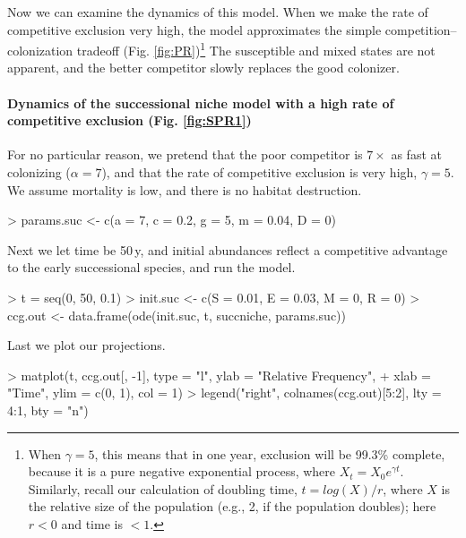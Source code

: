 Now we can examine the dynamics of this model. When we make the rate of competitive exclusion very high, the model approximates the simple competition--colonization tradeoff  (Fig. \ref{fig:PR})\footnote{When $\gamma=5$, this means that in one year, exclusion will be 99.3\% complete, because it is a pure negative exponential process, where $X_t=X_0e^{\gamma t}$. Similarly, recall our calculation of doubling time, $t=log(X)/r$, where $X$ is the relative size of the population (e.g., 2, if the population doubles); here $r<0$ and time is $< 1$.} The susceptible and mixed states are not apparent, and the better competitor slowly replaces the good colonizer.

\medskip \noindent
\begin{boxedminipage}{\linewidth}
  {\footnotesize
\paragraph{Dynamics of the successional niche model with a high rate of competitive exclusion (Fig. \ref{fig:SPR1})} 
For no particular reason, we pretend that the poor competitor is $7 \times$ as fast at colonizing ($\alpha=7$), and that the rate of competitive exclusion is very high, $\gamma=5$. We assume mortality is low, and there is no habitat destruction.
\begin{Schunk}
\begin{Sinput}
> params.suc <- c(a = 7, c = 0.2, g = 5, m = 0.04, D = 0)
\end{Sinput}
\end{Schunk}
Next we let time be 50\,y, and initial abundances reflect a competitive advantage to the early successional species, and run the model.
\begin{Schunk}
\begin{Sinput}
> t = seq(0, 50, 0.1)
> init.suc <- c(S = 0.01, E = 0.03, M = 0, R = 0)
> ccg.out <- data.frame(ode(init.suc, t, succniche, params.suc))
\end{Sinput}
\end{Schunk}
Last we plot our projections.
\begin{Schunk}
\begin{Sinput}
> matplot(t, ccg.out[, -1], type = "l", ylab = "Relative Frequency", 
+     xlab = "Time", ylim = c(0, 1), col = 1)
> legend("right", colnames(ccg.out)[5:2], lty = 4:1, bty = "n")
\end{Sinput}
\end{Schunk}
}
\end{boxedminipage} \medskip

